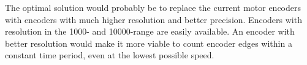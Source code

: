 \documentclass[../../main.tex]{subfiles}
\begin{document}



The optimal solution would probably be to replace the current motor encoders with encoders with much higher resolution and better precision. Encoders with resolution in the 1000- and 10000-range are easily available. An encoder with better resolution would make it more viable to count encoder edges within a constant time period, even at the lowest possible speed.

\end{document}
